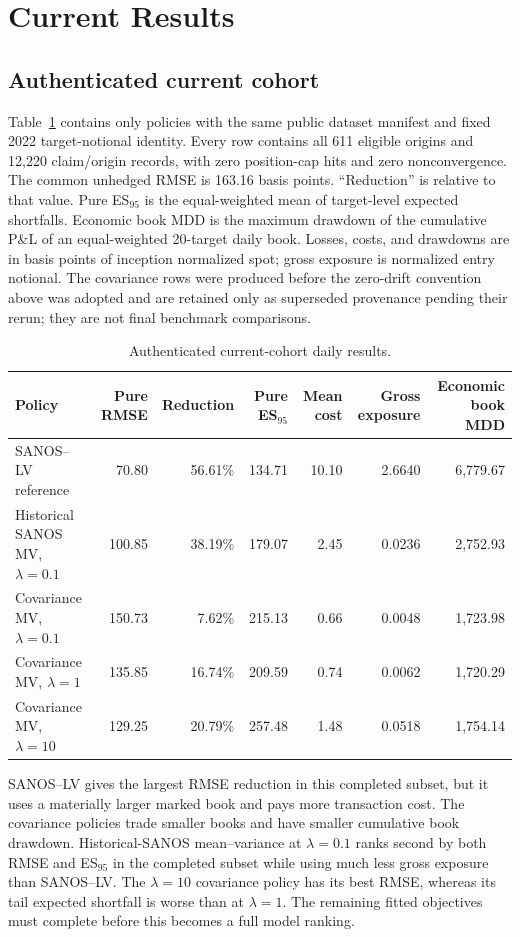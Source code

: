 \documentclass[10pt]{article}
\begin{document}
\section{Current Results}

\subsection{Authenticated current cohort}

Table~\ref{tab:risk} contains only policies with the same public dataset
manifest and fixed 2022 target-notional identity. Every row contains all 611
eligible origins and 12,220 claim/origin records, with zero position-cap hits
and zero nonconvergence. The common unhedged RMSE is 163.16 basis points.
``Reduction'' is relative to that value. Pure ES$_{95}$ is the equal-weighted
mean of target-level expected shortfalls. Economic book MDD is the maximum
drawdown of the cumulative P\&L of an equal-weighted 20-target daily book.
Losses, costs, and drawdowns are in basis points of inception normalized spot;
gross exposure is normalized entry notional.
The covariance rows were produced before the zero-drift convention above was
adopted and are retained only as superseded provenance pending their rerun;
they are not final benchmark comparisons.

\begin{table}[H]
\centering
\small
\caption{Authenticated current-cohort daily results.}
\label{tab:risk}
\begin{tabular}{@{}lrrrrrr@{}}
\toprule
Policy & Pure RMSE & Reduction & Pure ES$_{95}$ & Mean cost & Gross exposure & Economic book MDD \\
\midrule
SANOS--LV reference & 70.80 & 56.61\% & 134.71 & 10.10 & 2.6640 & 6,779.67 \\
Historical SANOS MV, $\lambda=0.1$ & 100.85 & 38.19\% & 179.07 & 2.45 & 0.0236 & 2,752.93 \\
Covariance MV, $\lambda=0.1$ & 150.73 & 7.62\% & 215.13 & 0.66 & 0.0048 & 1,723.98 \\
Covariance MV, $\lambda=1$ & 135.85 & 16.74\% & 209.59 & 0.74 & 0.0062 & 1,720.29 \\
Covariance MV, $\lambda=10$ & 129.25 & 20.79\% & 257.48 & 1.48 & 0.0518 & 1,754.14 \\
\bottomrule
\end{tabular}
\end{table}

SANOS--LV gives the largest RMSE reduction in this completed subset, but it uses
a materially larger marked book and pays more transaction cost. The covariance
policies trade smaller books and have smaller cumulative book drawdown.
Historical-SANOS mean--variance at $\lambda=0.1$ ranks second by both RMSE and
ES$_{95}$ in the completed subset while using much less gross exposure than
SANOS--LV. The $\lambda=10$ covariance policy has its best RMSE, whereas its
tail expected shortfall is worse than at $\lambda=1$. The remaining fitted
objectives must complete before this becomes a full model ranking.
\end{document}
